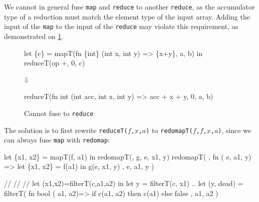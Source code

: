 We cannot in general fuse \texttt{map} and \texttt{reduce} to another
\texttt{reduce}, as the accumulator type of a reduction must match the
element type of the input array. Adding the input of the \texttt{map}
to the input of the \texttt{reduce} may violate this requirement, as
demonstrated on \cref{fig:map-reduce-error}.

\begin{figure}
\centering
\begin{bcolorcode}
let \{c\} = mapT(fn \{int\} (int x, int y) => \{x+y\},
                 a, b) in
reduceT(op +, 0, c)
\end{bcolorcode}

\(\emphh{\Downarrow}\)

\begin{bcolorcode}
reduceT(fn int (int acc, int x, int y) => acc + x + y,
        0, a, b) 
\end{bcolorcode}

\caption{Cannot fuse to \texttt{reduce}}
\label{fig:map-reduce-error}
\end{figure}

The solution is to first rewrite \texttt{reduceT($f$,$x$,$a$)} to
\texttt{redomapT($f$,$f$,$x$,$a$)}, since we can always fuse
\texttt{map} with \texttt{redomap}:
\begin{center}
\begin{bcolorcode}
let \{x1, x2\} = mapT(f, a1)
in  redomapT(\mymath{\oplus}, g, e, x1, y)
    \emphh{\mymath{\Downarrow}}
redomapT(\mymath{\oplus}
, fn \mymath{\beta} (\mymath{\beta} e,  a1,  y)
   => let \{x1, x2\} = f(a1)
      in  g(e, x1, y)
, e, a1, y )
\end{bcolorcode}
\end{center}

\begin{center}
\begin{bcolorcode}
//
//
//
let (x1,x2)=filterT(c,a1,a2)
in  let y = filterT(c, x1) ..
    \emphh{\mymath{\Downarrow}}
let (y, dead) = filterT(
  fn bool ( a1, a2)=>
      if   c(a1, a2)
      then c(a1)
      else false
, a1, a2 )
\end{bcolorcode}
\end{center}


